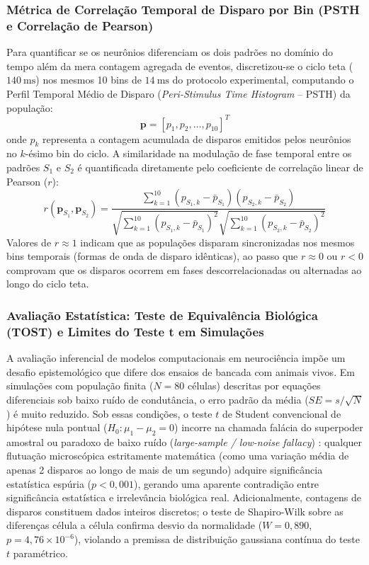 \documentclass[11pt,a4paper,article,brazil]{abntex2}
\begin{document}
\subsubsection{Métrica de Correlação Temporal de Disparo por Bin (PSTH e Correlação de Pearson)}
Para quantificar se os neurônios diferenciam os dois padrões no domínio do tempo além da mera contagem agregada de eventos, discretizou-se o ciclo teta ($\qty{140}{\milli\second}$) nos mesmos 10 bins de $\qty{14}{\milli\second}$ do protocolo experimental, computando o Perfil Temporal Médio de Disparo (\emph{Peri-Stimulus Time Histogram} -- PSTH) da população:
\begin{equation}
    \mathbf{p} = [p_1, p_2, \dots, p_{10}]^T
\end{equation}
onde $p_k$ representa a contagem acumulada de disparos emitidos pelos neurônios no $k$-ésimo bin do ciclo. A similaridade na modulação de fase temporal entre os padrões $S_1$ e $S_2$ é quantificada diretamente pelo coeficiente de correlação linear de Pearson ($r$):
\begin{equation}
    r(\mathbf{p}_{S_1}, \mathbf{p}_{S_2}) = \frac{\sum_{k=1}^{10} (p_{S_1, k} - \bar{p}_{S_1})(p_{S_2, k} - \bar{p}_{S_2})}{\sqrt{\sum_{k=1}^{10} (p_{S_1, k} - \bar{p}_{S_1})^2} \sqrt{\sum_{k=1}^{10} (p_{S_2, k} - \bar{p}_{S_2})^2}}
\end{equation}
Valores de $r \approx 1$ indicam que as populações disparam sincronizadas nos mesmos bins temporais (formas de onda de disparo idênticas), ao passo que $r \approx 0$ ou $r < 0$ comprovam que os disparos ocorrem em fases descorrelacionadas ou alternadas ao longo do ciclo teta.

\subsubsection{Avaliação Estatística: Teste de Equivalência Biológica (TOST) e Limites do Teste t em Simulações}
A avaliação inferencial de modelos computacionais em neurociência impõe um desafio epistemológico que difere dos ensaios de bancada com animais vivos. Em simulações com população finita ($N = 80$ células) descritas por equações diferenciais sob baixo ruído de condutância, o erro padrão da média ($SE = s / \sqrt{N}$) é muito reduzido. Sob essas condições, o teste $t$ de Student convencional de hipótese nula pontual ($H_0: \mu_1 - \mu_2 = 0$) incorre na chamada falácia do superpoder amostral ou paradoxo de baixo ruído (\emph{large-sample / low-noise fallacy}) \cite{lakens2017}: qualquer flutuação microscópica estritamente matemática (como uma variação média de apenas 2 disparos ao longo de mais de um segundo) adquire significância estatística espúria ($p < 0{,}001$), gerando uma aparente contradição entre significância estatística e irrelevância biológica real. Adicionalmente, contagens de disparos constituem dados inteiros discretos; o teste de Shapiro-Wilk sobre as diferenças célula a célula confirma desvio da normalidade ($W = 0{,}890$, $p = 4{,}76 \times 10^{-6}$), violando a premissa de distribuição gaussiana contínua do teste $t$ paramétrico.
\end{document}
